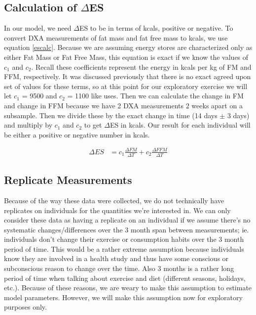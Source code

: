 \documentclass[11pt]{article}\usepackage[]{graphicx}\usepackage[]{color}
\begin{document}
\subsection{Calculation of $\Delta$ES}

In our model, we need $\Delta$ES to be in terms of kcals, positive or negative. To convert DXA measurements of fat mass and fat free mass to kcals, we use equation \eqref{escalc}. Because we are assuming energy stores are characterized only as either Fat Mass or Fat Free Mass, this equation is exact if we know the values of $c_1$ and $c_2$. Recall these coefficients represent the energy in kcals per kg of FM and FFM, respectively. It was discussed previously that there is no exact agreed upon set of values for these terms, so at this point for our exploratory exercise we will let $c_1$ = 9500 and $c_2$ = 1100 like \cite{thomas11} uses. Then we can calculate the change in FM and change in FFM because we have 2 DXA measurements 2 weeks apart on a subsample. Then we divide these by the exact change in time (14 days $\pm$ 3 days) and multiply by $c_1$ and $c_2$ to get $\Delta$ES in kcals. Our result for each individual will be either a positive or negative number in kcals.

\begin{align}
  \label{escalc}
  \Delta ES &= c_1 \frac{\Delta FM}{\Delta T} + c_2 \frac{\Delta FFM}{\Delta T}
\end{align}

\subsection{Replicate Measurements}

Because of the way these data were collected, we do not technically have replicates on individuals for the quantities we're interested in. We can only consider these data as having a replicate on an individual if we assume there's no systematic changes/differences over the 3 month span between measurements; ie. individuals don't change their exercise or consumption habits over the 3 month period of time. This would be a rather extreme assumption because individuals know they are involved in a health study and thus have some conscious or subconscious reason to change over the time. Also 3 months is a rather long period of time when talking about exercise and diet (different seasons, holidays, etc.). Because of these reasons, we are weary to make this assumption to estimate model parameters. However, we will make this assumption now for exploratory purposes only. 
\end{document}
